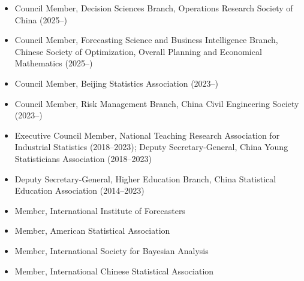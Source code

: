 \documentclass[twoside,a4paper]{article}
\begin{document}
\begin{itemize}
\item Council Member, Decision Sciences Branch, Operations Research Society of China (2025--)
\item Council Member, Forecasting Science and Business Intelligence Branch, Chinese Society of Optimization, Overall Planning and Economical Mathematics (2025--)
\item Council Member, Beijing Statistics Association (2023--)
\item Council Member, Risk Management Branch, China Civil Engineering Society (2023--)
\item Executive Council Member, National Teaching Research Association for Industrial Statistics (2018--2023); Deputy Secretary-General, China Young Statisticians Association (2018--2023)
\item Deputy Secretary-General, Higher Education Branch, China Statistical Education Association (2014--2023)
\item Member, International Institute of Forecasters
\item Member, American Statistical Association
\item Member, International Society for Bayesian Analysis
\item Member, International Chinese Statistical Association
\end{itemize}





\end{document}
